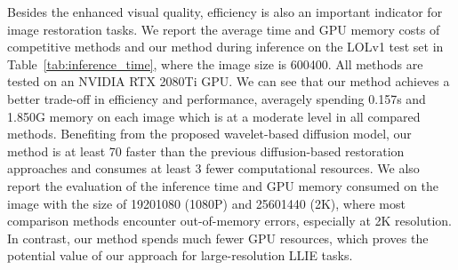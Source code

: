 Besides the enhanced visual quality, efficiency is also an important indicator for image restoration tasks. We report the average time and GPU memory costs of competitive methods and our method during inference on the LOLv1 test set in Table~\ref{tab:inference_time}, where the image size is 600400. All methods are tested on an NVIDIA RTX 2080Ti GPU. We can see that our method achieves a better trade-off in efficiency and performance, averagely spending 0.157s and 1.850G memory on each image which is at a moderate level in all compared methods. Benefiting from the proposed wavelet-based diffusion model, our method is at least 70 faster than the previous diffusion-based restoration approaches and consumes at least 3 fewer computational resources. We also report the evaluation of the inference time and GPU memory consumed on the image with the size of 19201080 (1080P) and 25601440 (2K), where most comparison methods encounter out-of-memory errors, especially at 2K resolution. In contrast, our method spends much fewer GPU resources, which proves the potential value of our approach for large-resolution LLIE tasks.
